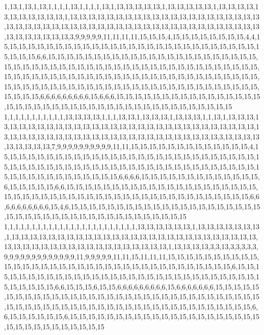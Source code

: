1,13,1,13,1,13,1,1,1,1,13,1,1,1,1,13,1,13,13,13,13,13,1,13,13,13,13,13,1,13,13,13,13,13,13,13,13,13,13,13,1,13,13,13,13,13,13,13,13,13,13,13,13,13,13,13,13,13,13,13,13,13,13,13,13,13,13,13,13,13,13,13,13,13,13,13,13,13,13,13,13,13,13,13,13,13,13,13,13,13,13,13,13,13,13,13,13,3,9,9,9,9,9,11,11,11,11,15,15,15,4,15,15,15,15,15,15,15,15,4,4,15,15,15,15,15,15,15,15,15,15,15,15,15,15,15,15,15,15,15,15,15,15,15,15,15,15,15,15,15,15,15,15,6,6,15,15,15,15,15,15,15,15,15,15,15,15,15,15,15,15,15,15,15,15,15,15,15,15,15,15,15,15,15,15,15,15,15,15,15,15,15,15,15,15,15,15,15,15,15,15,15,15,15,15,15,15,15,15,15,15,15,15,15,15,15,15,15,15,15,15,15,15,15,15,15,15,15,15,15,15,15,15,15,15,15,15,15,15,15,15,15,15,15,15,15,15,15,15,15,15,15,15,15,15,15,15,15,15,15,15,15,15,15,15,15,6,6,6,6,6,6,6,6,6,15,6,6,6,15,15,15,15,15,15,15,15,15,15,15,15,15,15,15,15,15,15,15,15,15,15,15,15,15,15,15,15,15,15,15,15,15,15,15,15,15,15,15,15,15
1,1,1,1,1,1,1,1,1,1,1,13,13,13,13,1,1,1,13,13,1,13,13,13,1,13,13,13,1,1,13,1,13,13,13,13,13,13,13,13,13,13,13,13,13,13,13,13,13,13,13,13,13,13,13,13,13,13,13,13,13,13,13,13,13,13,13,13,13,13,13,13,13,13,13,13,13,13,13,13,13,13,13,13,13,13,13,3,13,13,13,13,13,13,13,13,13,7,9,9,9,9,9,9,9,9,9,9,11,11,15,15,15,15,15,15,15,15,15,15,15,15,15,4,15,15,15,15,15,15,15,15,15,15,15,15,15,15,15,15,15,15,15,15,15,15,15,15,15,15,15,15,15,15,15,15,15,15,15,15,15,15,15,15,15,15,15,15,15,15,15,15,15,15,15,15,15,15,15,15,15,15,15,15,15,15,15,15,15,15,15,15,15,6,6,6,6,15,15,15,15,15,15,15,15,15,15,15,15,15,6,15,15,15,15,15,6,6,15,15,15,15,15,15,15,15,15,15,15,15,15,15,15,15,15,15,15,15,15,15,15,15,15,15,15,15,15,15,15,15,15,15,15,15,15,15,15,15,15,15,15,15,15,15,15,15,6,6,6,6,6,6,6,6,6,6,15,4,6,15,15,15,15,15,15,15,15,15,15,15,15,15,15,15,15,15,15,15,15,15,15,15,15,15,15,15,15,15,15,15,15,15,15,15,15,15,15,15,15,15
1,1,1,1,1,1,1,1,1,1,1,1,1,1,1,1,1,1,1,1,1,1,1,1,13,13,13,13,13,13,1,13,13,13,13,13,13,13,1,13,13,13,13,13,13,13,13,13,13,13,13,13,13,13,13,13,13,13,13,13,13,13,13,13,13,13,13,13,13,13,13,13,13,13,13,13,13,13,13,13,13,13,13,13,1,13,13,13,13,3,3,13,3,3,3,3,3,9,9,9,9,9,9,9,9,9,9,9,9,9,11,9,9,9,9,9,11,11,15,11,11,11,15,15,15,15,15,15,15,15,15,15,15,15,15,15,15,15,15,15,15,15,15,15,15,15,15,15,15,15,15,15,15,15,15,15,15,6,15,15,15,15,15,15,15,15,15,15,15,15,15,15,15,15,15,15,15,15,15,15,15,15,15,15,15,15,15,15,15,15,15,15,15,15,6,6,15,15,15,6,15,15,6,6,6,6,6,6,6,6,6,15,6,6,6,6,6,6,6,15,15,15,15,15,15,15,15,15,15,15,15,15,15,15,15,15,15,15,15,15,15,15,15,15,15,15,15,15,15,15,15,15,15,15,15,15,15,15,15,15,15,15,15,15,15,15,15,15,15,15,15,15,15,15,15,15,15,15,15,6,6,15,15,15,15,15,15,6,15,15,15,15,15,15,15,15,15,15,15,15,15,15,15,15,15,15,15,15,15,15,15,15,15,15,15,15,15,15,15,15
